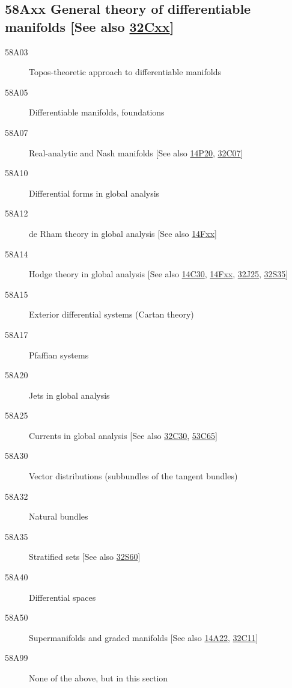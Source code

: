 \documentclass[letterpaper]{article}
\begin{document}
\subsection*{58Axx  General theory of differentiable manifolds [See also \hyperref[32Cxx]{32Cxx}] }\label{58Axx}
\begin{description}  
\item [58A03]\label{58A03} Topos-theoretic approach to differentiable manifolds
\item [58A05]\label{58A05} Differentiable manifolds, foundations
\item [58A07]\label{58A07} Real-analytic and Nash manifolds [See also \hyperref[14P20]{14P20}, \hyperref[32C07]{32C07}]
\item [58A10]\label{58A10} Differential forms in global analysis
\item [58A12]\label{58A12} de Rham theory in global analysis [See also \hyperref[14Fxx]{14Fxx}]
\item [58A14]\label{58A14} Hodge theory in global analysis [See also \hyperref[14C30]{14C30}, \hyperref[14Fxx]{14Fxx}, \hyperref[32J25]{32J25}, \hyperref[32S35]{32S35}]
\item [58A15]\label{58A15} Exterior differential systems (Cartan theory)
\item [58A17]\label{58A17} Pfaffian systems
\item [58A20]\label{58A20} Jets in global analysis
\item [58A25]\label{58A25} Currents in global analysis [See also \hyperref[32C30]{32C30}, \hyperref[53C65]{53C65}]
\item [58A30]\label{58A30} Vector distributions (subbundles of the tangent bundles)
\item [58A32]\label{58A32} Natural bundles
\item [58A35]\label{58A35} Stratified sets [See also \hyperref[32S60]{32S60}]
\item [58A40]\label{58A40} Differential spaces
\item [58A50]\label{58A50} Supermanifolds and graded manifolds [See also \hyperref[14A22]{14A22}, \hyperref[32C11]{32C11}]
\item [58A99]\label{58A99} None of the above, but in this section
\end{description}
\end{document}
